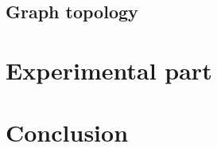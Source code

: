 \documentclass{svproc}
\providecommand{\doi}[1]{doi:\discretionary{}{}{}#1}
\begin{document}
%

%
\subsection{Graph topology}
%

%
\section{Experimental part}
%

%
\section{Conclusion}
%

%
%






\end{document}
